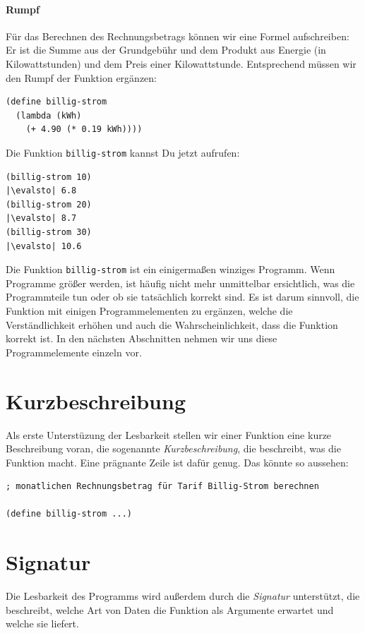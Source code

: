 \paragraph{Rumpf}

Für das Berechnen des Rechnungsbetrags können wir eine Formel
aufschreiben: Er ist die Summe aus der Grundgebühr und
dem Produkt aus Energie (in Kilowattstunden) und dem Preis einer Kilowattstunde.
Entsprechend müssen wir den Rumpf der
Funktion ergänzen:
%
\begin{lstlisting}
(define billig-strom
  (lambda (kWh)
    (+ 4.90 (* 0.19 kWh))))
\end{lstlisting}
%
Die Funktion \lstinline{billig-strom} kannst Du jetzt aufrufen:
%
\begin{lstlisting}
(billig-strom 10)
|\evalsto| 6.8
(billig-strom 20)
|\evalsto| 8.7
(billig-strom 30)
|\evalsto| 10.6
\end{lstlisting}
%
Die Funktion \lstinline{billig-strom} ist ein einigermaßen winziges
Programm.  Wenn Programme größer werden, ist häufig nicht mehr
unmittelbar ersichtlich, was die Programmteile tun oder ob sie
tatsächlich korrekt sind.  Es ist darum sinnvoll, die Funktion mit
einigen Programmelementen zu ergänzen, welche die Verständlichkeit
erhöhen und auch die Wahrscheinlichkeit, dass die Funktion korrekt
ist.  In den nächsten Abschnitten nehmen wir uns diese
Programmelemente einzeln vor.

\section{Kurzbeschreibung}

Als erste Unterstüzung der Lesbarkeit stellen wir einer Funktion eine
kurze Beschreibung voran, die
sogenannte \textit{Kurzbeschreibung}, die
beschreibt, was die Funktion macht.  Eine prägnante Zeile ist dafür
genug.  Das könnte so aussehen:
%
\begin{lstlisting}
; monatlichen Rechnungsbetrag für Tarif Billig-Strom berechnen

(define billig-strom ...)
\end{lstlisting}
%
\section{Signatur}

Die Lesbarkeit des Programms wird außerdem durch die
\textit{Signatur} unterstützt, die
beschreibt, welche Art von Daten die Funktion als Argumente erwartet und welche sie liefert.

